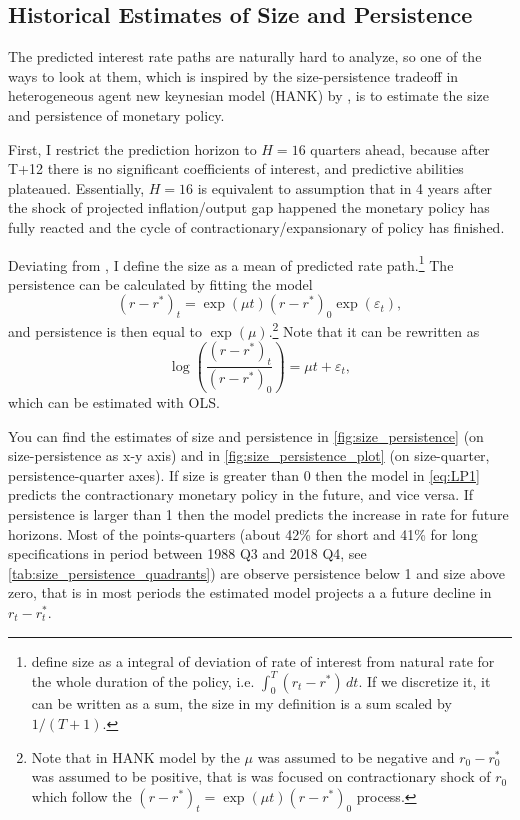 \documentclass[11pt]{article}
\begin{document}
\subsection{Historical Estimates of Size and Persistence}
\label{sec:size_persistence}


The predicted interest rate paths are naturally hard to analyze, so one of the ways to look at them, which is inspired by the size-persistence tradeoff in heterogeneous agent new keynesian model (HANK) by \citet{KMV2018}, is to estimate the size and persistence of monetary policy. 

First, I restrict the prediction horizon to $H=16$ quarters ahead, because after T+12 there is no significant coefficients of interest, and predictive abilities plateaued. 
Essentially, $H=16$ is equivalent to assumption that in 4 years after the shock of projected inflation/output gap happened the monetary policy has fully reacted and the cycle of contractionary/expansionary of policy has finished.

Deviating from \citet{KMV2018}, I define the size as a mean of predicted rate path.\footnote{\citet{KMV2018} define size as a integral of deviation of rate of interest from natural rate for the whole duration of the policy, i.e. $\int_0^T \left(r_t-r^*\right)\,dt$. If we discretize it, it can be written as a sum, the size in my definition is a sum scaled by $1/(T+1)$.} 
The persistence can be calculated by fitting the model 
\[\left(r-r^*\right)_t=\exp(\mu t)\left(r-r^*\right)_0\exp(\varepsilon_t),\]
and persistence is then equal to $\exp(\mu)$.\footnote{Note that in HANK model by \citet{KMV2018} the $\mu$ was assumed to be negative and $r_0-r_0^*$ was assumed to be positive, that is \citet{KMV2018} was focused on contractionary shock of $r_0$ which follow the $\left(r-r^*\right)_t=\exp(\mu t)\left(r-r^*\right)_0$ process.} Note that it can be rewritten as
\[\log\left(\frac{\left(r-r^*\right)_t}{\left(r-r^*\right)_0}\right)=\mu t+\varepsilon_t,\]
which can be estimated with OLS. 


You can find the estimates of size and persistence in \vref{fig:size_persistence} (on size-persistence as x-y axis) and in \vref{fig:size_persistence_plot} (on size-quarter, persistence-quarter axes).
If size is greater than 0 then the model in \vref{eq:LP1} predicts the contractionary monetary policy in the future, and vice versa. 
If persistence is larger than 1 then the model predicts the increase in rate for future horizons. 
Most of the points-quarters (about 42\% for short and 41\% for long specifications in period between 1988 Q3 and 2018 Q4, see \vref{tab:size_persistence_quadrants}) are observe persistence below 1 and size above zero, that is in most periods the estimated model projects a a future decline in $r_t-r_t^*$.  
\end{document}
